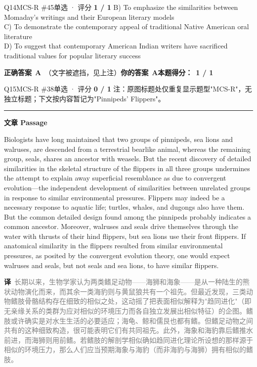 \documentclass[11pt]{article}
\newcommand{\ptesub}[1]{%
  \par\needspace{2\baselineskip}\smallskip
  {\color{cAccent}\rule[-0.2ex]{3pt}{1.05em}}\hspace{6pt}%
  {\bfseries\color{cHead}#1}\par\nopagebreak\smallskip}
\newcommand{\zh}[1]{{\footnotesize\textcolor{cNote}{\textbf{译}}\ \textcolor{gray}{#1}}}
\begin{document}
\begin{qblock}{Q14\quad MCS-R \#45}{单选 · 评分 \textcolor{cAccent}{\bfseries 1 / 1}}
{B) To emphasize the similarities between Momaday's writings and their European literary models\\
C) To demonstrate the contemporary appeal of traditional Native American oral literature\\
D) To suggest that contemporary American Indian writers have sacrificed traditional values for popular literary success}
\par\smallskip
\textbf{正确答案}\ \textcolor{cFix}{\bfseries A}\ {\footnotesize\color{gray}（文字被遮挡，见上注）}\qquad\textbf{你的答案}\ \textcolor{cFix}{\bfseries A}\qquad\textbf{本题得分：}\ {\color{cAccent}\bfseries 1 / 1}
\end{qblock}

\begin{qblock}{Q15\quad MCS-R \#38}{单选 · 评分 \textcolor{cAccent}{\bfseries 0 / 1}}
{\footnotesize\color{gray} 注：原图标题处仅重复显示题型"MCS-R"，无独立标题；下文按内容暂记为"Pinnipeds' Flippers"。}
\ptesub{文章 Passage}
\begin{promptbox}
Biologists have long maintained that two groups of pinnipeds, sea lions and walruses, are descended from a terrestrial bearlike animal, whereas the remaining group, seals, shares an ancestor with weasels. But the recent discovery of detailed similarities in the skeletal structure of the flippers in all three groups undermines the attempt to explain away superficial resemblance as due to convergent evolution---the independent development of similarities between unrelated groups in response to similar environmental pressures. Flippers may indeed be a necessary response to aquatic life; turtles, whales, and dugongs also have them. But the common detailed design found among the pinnipeds probably indicates a common ancestor. Moreover, walruses and seals drive themselves through the water with thrusts of their hind flippers, but sea lions use their front flippers. If anatomical similarity in the flippers resulted from similar environmental pressures, as posited by the convergent evolution theory, one would expect walruses and seals, but not seals and sea lions, to have similar flippers.
\end{promptbox}
\zh{长期以来，生物学家认为两类鳍足动物——海狮和海象——是从一种陆生的熊状动物演化而来，而其余一类海豹则与黄鼠狼共有一个祖先。但最近发现，三类动物鳍肢骨骼结构存在细致的相似之处，这动摇了把表面相似解释为"趋同进化"（即无亲缘关系的类群为应对相似的环境压力而各自独立发展出相似特征）的企图。鳍肢或许确实是对水生生活的必要适应；海龟、鲸和儒艮也都有鳍。但鳍足动物之间共有的这种细致构造，很可能表明它们有共同祖先。此外，海象和海豹靠后鳍推水前进，而海狮则用前鳍。若鳍肢的解剖学相似确如趋同进化理论所设想的那样源于相似的环境压力，那么人们应当预期海象与海豹（而非海豹与海狮）拥有相似的鳍肢。}

\end{qblock}
\end{document}
